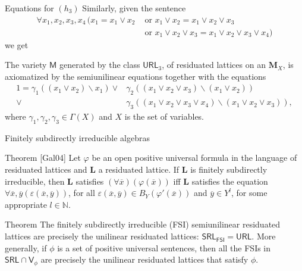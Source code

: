 \documentclass[professionalfont, 12pt]{beamer} %
\theoremstyle{plain}
\theoremstyle{definition}
\newcommand{\m}[1]{{\mathbf {#1} }}
\newcommand{\bb}[1]{\mathbb {#1}}
\begin{document}
\begin{frame}{Equations for $(h_3)$}
Similarly, given the sentence
\begin{align*}
    \forall x_1, x_2, x_3, x_4 \, (x_1 = x_1 \vee x_2 & \text{ or } x_1 \vee x_2 = x_1 \vee x_2 \vee x_3\\
    & \text{ or } x_1 \vee x_2 \vee x_3 = x_1 \vee x_2 \vee x_3 \vee x_4)
\end{align*}
we get
\begin{block}{}
    The variety $\mathsf{M}$ generated by the class $\mathsf{URL}_3$, of residuated lattices on an $\mathbf{M}_X$, is axiomatized by the semiunilinear equations together with the equations 
    \begin{align*}
        1 = \gamma_1((x_1 \vee x_2)\backslash x_1) \vee & \gamma_2((x_1 \vee x_2 \vee x_3)\backslash (x_1 \vee x_2))\\
        \vee & \gamma_3((x_1 \vee x_2 \vee x_3 \vee x_4) \backslash (x_1 \vee x_2 \vee x_3)),
    \end{align*}
    where $\gamma_1, \gamma_2, \gamma_3 \in \Gamma(X)$ and $X$ is the set of variables.
\end{block}

\end{frame}

\begin{frame}{Finitely subdirectly irreducible algebras}
    \begin{block}{Theorem [Gal04]}
        Let $\varphi$ be an open positive universal formula in the language of residuated lattices and $\m L$ a residuated lattice.
        If $\m L$ is finitely subdirectly irreducible, then $\m L$ satisfies $(\forall \overline{x})(\varphi(\overline{x}))$ iff $\m L$ satisfies the equation $\forall \overline{x}, \overline{y} (\varepsilon(\overline{x}, \overline{y}))$, for all $\varepsilon(\overline{x}, \overline{y}) \in B_Y(\varphi'(\overline{x}))$ and $\overline{y} \in Y^l$, for some appropriate $l \in \bb{N}$.
    \end{block}
    \pause
    
    \begin{block}{Theorem}
        The finitely subdirectly irreducible (FSI) semiunilinear residuated lattices are precisely the unilinear residuated lattices: $\mathsf{SRL_{FSI}} = \mathsf{URL}$.
        More generally, if $\phi$ is a set of positive universal sentences, then all the FSIs in  $\mathsf{SRL} \cap \mathsf{V}_\phi$ are precisely the unilinear residuated lattices that satisfy $\phi$.
    \end{block}

\end{frame}
\end{document}

